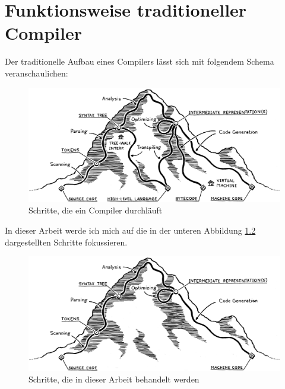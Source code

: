 \chapter{Funktionsweise traditioneller Compiler} \label{cha:3-Tradional_Compiler}

Der traditionelle Aufbau eines Compilers lässt sich mit folgendem Schema veranschaulichen:

\begin{figure}[h!]
    \centering
    \includegraphics[scale=0.2]{resources/images/mountain.png}
    \caption[Schritte, die ein Compiler durchläuft (https://github.com/munificent/craftinginterpreters, besucht am 5.8.2024)]{Schritte, die ein Compiler durchläuft}
    \label{fig:mountain}
\end{figure}

In dieser Arbeit werde ich mich auf die in der unteren Abbildung \ref{fig:mountain-edited} dargestellten Schritte fokussieren.

\begin{figure}[h!]
    \centering
    \includegraphics[scale=0.2]{resources/images/mountain-edited.png}
    \caption[Schritte, die in dieser Arbeit behandelt werden (Basierend auf Abbildung \ref{fig:mountain})]{Schritte, die in dieser Arbeit behandelt werden}
    \label{fig:mountain-edited}
\end{figure}

